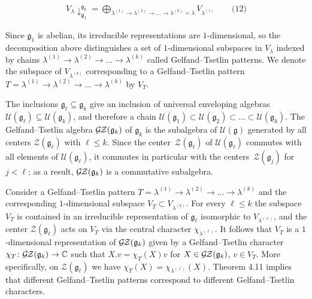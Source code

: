\[\begin{aligned}
\displaystyle V_{\lambda}{\downarrow}^{\mathfrak{g}_{k}}_{\mathfrak{g}_{1}}=\bigoplus_{\lambda^{(1)}\to\lambda^{(2)}\to\dots\to\lambda^{(k)}=\lambda}V_{\lambda^{(1)}}\qquad\text{(12)}
\end{aligned}\]


Since $\mathfrak{g}_{1}$ is abelian, its irreducible representations are $1$-dimensional, so the decomposition above distinguishes a set of $1$-dimensional subspaces in $V_{\lambda}$ indexed by chains $\lambda^{(1)}\to\lambda^{(2)}\to\dots\to\lambda^{(k)}$ called Gelfand–Tsetlin patterns.
We denote the subspace of $V_{\lambda^{(k)}}$ corresponding to a Gelfand–Tsetlin pattern $T=\lambda^{(1)}\to\lambda^{(2)}\to\dots\to\lambda^{(k)}$ by $V_{T}$.





The inclusions $\mathfrak{g}_{\ell}\subseteq\mathfrak{g}_{k}$ give an inclusion of universal enveloping algebras $\mathcal{U}(\mathfrak{g}_{\ell})\subseteq\mathcal{U}(\mathfrak{g}_{k})$, and therefore a chain $\mathcal{U}(\mathfrak{g}_{1})\subset\mathcal{U}(\mathfrak{g}_{2})\subset\dots\subset\mathcal{U}(\mathfrak{g}_{k})$. The Gelfand–Tsetlin algebra $\mathcal{G}\hskip-1.00006pt\mathcal{Z}(\mathfrak{g}_{k})$ of $\mathfrak{g}_{k}$ is the subalgebra of $\mathcal{U}(\mathfrak{g})$ generated by all centers $\mathcal{Z}(\mathfrak{g}_{\ell})$ with $\ell\leq k$. Since the center $\mathcal{Z}(\mathfrak{g}_{\ell})$ of $\mathcal{U}(\mathfrak{g}_{\ell})$ commutes with all elements of $\mathcal{U}(\mathfrak{g}_{\ell})$, it commutes in particular with the centers $\mathcal{Z}(\mathfrak{g}_{j})$ for $j<\ell$; as a result, $\mathcal{G}\hskip-1.00006pt\mathcal{Z}(\mathfrak{g}_{k})$ is a commutative subalgebra.





Consider a Gelfand–Tsetlin pattern $T=\lambda^{(1)}\to\lambda^{(2)}\to\dots\to\lambda^{(k)}$ and the corresponding $1$-dimensional subspace $V_{T}\subset V_{\lambda^{(k)}}$.
For every $\ell\leq k$ the subspace $V_{T}$ is contained in an irreducible representation of $\mathfrak{g}_{\ell}$ isomorphic to $V_{\lambda^{(\ell)}}$, and the center $\mathcal{Z}(\mathfrak{g}_{\ell})$ acts on $V_{T}$ via the central character $\chi_{\lambda^{(\ell)}}$.
It follows that $V_{T}$ is a $1$-dimensional representation of $\mathcal{G}\hskip-1.00006pt\mathcal{Z}(\mathfrak{g}_{k})$ given by a Gelfand–Tsetlin character $\chi_{T}\colon\mathcal{G}\hskip-1.00006pt\mathcal{Z}(\mathfrak{g}_{k})\to\mathbb{C}$ such that $X.v=\chi_{T}(X)v$ for $X\in\mathcal{G}\hskip-1.00006pt\mathcal{Z}(\mathfrak{g}_{k})$, $v\in V_{T}$.
More specifically, on $\mathcal{Z}(\mathfrak{g}_{\ell})$ we have $\chi_{T}(X)=\chi_{\lambda^{(\ell)}}(X)$.
Theorem 4.11 implies that different Gelfand–Tsetlin patterns correspond to different Gelfand–Tsetlin characters.





